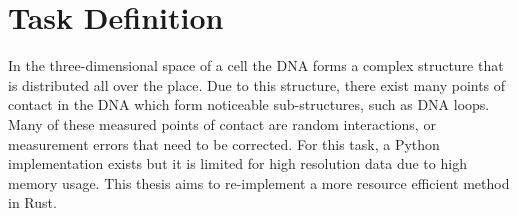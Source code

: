 %
%
%
%
%
%



\section{Task Definition}\label{sec:task}

In the three-dimensional space of a cell the DNA forms a complex structure that is
distributed all over the place. Due to this structure, there exist many points of contact
in the DNA which form noticeable sub-structures, such as DNA loops. Many
of these measured points of contact are random interactions, or measurement errors that
need to be corrected. For this task, a Python implementation exists but it is
limited for high resolution data due to high memory usage. This thesis aims to
re-implement a more resource efficient method in Rust.

